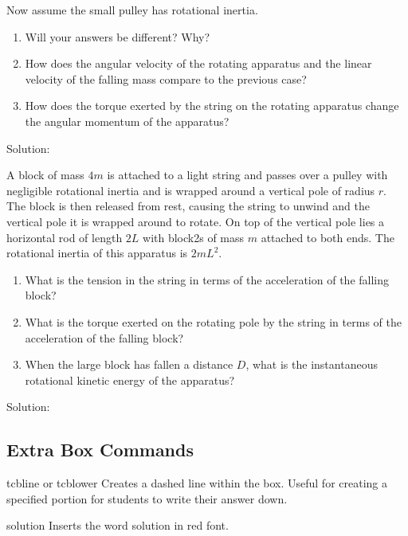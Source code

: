 \documentclass[12pt,hidelinks]{article}
\newcommand{\solution}{\textcolor{mordantred19}{Solution:}}
\begin{document}
	\vspace*{1\baselineskip}
\begin{disexam}
\begin{example}
Now assume the small pulley has rotational inertia.
\begin{enumerate}
\item Will your answers be different? Why?
\item How does the angular velocity of the rotating apparatus and the linear velocity of the falling mass compare to the previous case?
\item How does the torque exerted by the string on the rotating apparatus change the angular momentum of the apparatus?
\end{enumerate}
\tcbline
\vspace{1mm}
\solution
\end{example}
\end{disexam}
\begin{disexam}
\begin{longexample}
A block of mass $4m$ is attached to a light string and passes over a pulley with negligible rotational inertia and is wrapped around a vertical pole of radius $r$.  The block is then released from rest, causing the string to unwind and the vertical pole it is wrapped around to rotate.  On top of the vertical pole lies a horizontal rod of length $2L$ with block2s of mass $m$ attached to both ends.  The rotational inertia of this apparatus is $2mL^2$.
\begin{enumerate}
\item What is the tension in the string in terms of the acceleration of the falling block?
\item What is the torque exerted on the rotating pole by the string in terms of the acceleration of the falling block?
\item When the large block has fallen a distance $D$, what is the instantaneous rotational kinetic energy of the apparatus?
\end{enumerate}
\tcblower
\vspace{1mm}
\solution
\end{longexample}
\end{disexam}
\vspace{1.5mm}
	\subsection{Extra Box Commands}
		\begin{docCommand}{tcbline or tcblower}{}
				Creates a dashed line within the box. Useful for creating a specified portion for students to write their answer down.
		\end{docCommand}
		\begin{docCommand}{solution}{}
				Inserts the word solution in red font.
		\end{docCommand}
\end{document}
